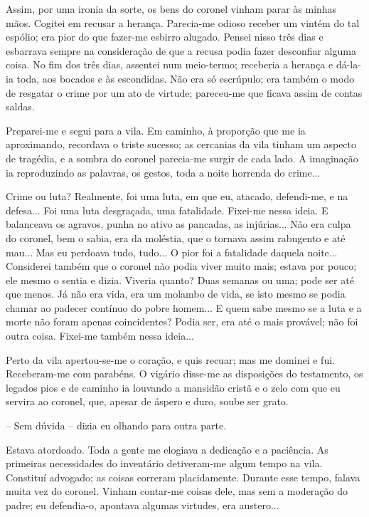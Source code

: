 Assim, por uma ironia da sorte, os bens do coronel vinham parar às
minhas mãos. Cogitei em recusar a herança. Parecia-me odioso receber um
vintém do tal espólio; era pior do que fazer-me esbirro alugado. Pensei
nisso três dias e esbarrava sempre na consideração de que a recusa podia
fazer desconfiar alguma coisa. No fim dos três dias, assentei num
meio-termo; receberia a herança e dá-la-ia toda, aos bocados e às
escondidas. Não era só escrúpulo; era também o modo de resgatar o crime
por um ato de virtude; pareceu-me que ficava assim de contas saldas.

Preparei-me e segui para a vila. Em caminho, à proporção que me ia
aproximando, recordava o triste sucesso; as cercanias da vila tinham um
aspecto de tragédia, e a sombra do coronel parecia-me surgir de cada
lado. A imaginação ia reproduzindo as palavras, os gestos, toda a noite
horrenda do crime...

Crime ou luta? Realmente, foi uma luta, em que eu, atacado, defendi-me,
e na defesa... Foi uma luta desgraçada, uma fatalidade. Fixei-me nessa
ideia. E balanceava os agravos, punha no ativo as pancadas, as
injúrias... Não era culpa do coronel, bem o sabia, era da moléstia, que
o tornava assim rabugento e até mau... Mas eu perdoava tudo, tudo... O
pior foi a fatalidade daquela noite... Considerei também que o coronel
não podia viver muito mais; estava por pouco; ele mesmo o sentia e
dizia. Viveria quanto? Duas semanas ou uma; pode ser até que menos. Já
não era vida, era um molambo de vida, se isto mesmo se podia chamar ao
padecer contínuo do pobre homem... E quem sabe mesmo se a luta e a morte
não foram apenas coincidentes? Podia ser, era até o mais provável; não
foi outra coisa. Fixei-me também nessa ideia...

Perto da vila apertou-se-me o coração, e quis recuar; mas me dominei e
fui. Receberam-me com parabéns. O vigário disse-me as disposições do
testamento, os legados pios e de caminho ia louvando a mansidão cristã e
o zelo com que eu servira ao coronel, que, apesar de áspero e duro,
soube ser grato.

-- Sem dúvida -- dizia eu olhando para outra parte.

Estava atordoado. Toda a gente me elogiava a dedicação e a paciência. As
primeiras necessidades do inventário detiveram-me algum tempo na vila.
Constituí advogado; as coisas correram placidamente. Durante esse tempo,
falava muita vez do coronel. Vinham contar-me coisas dele, mas sem a
moderação do padre; eu defendia-o, apontava algumas virtudes, era
austero...

